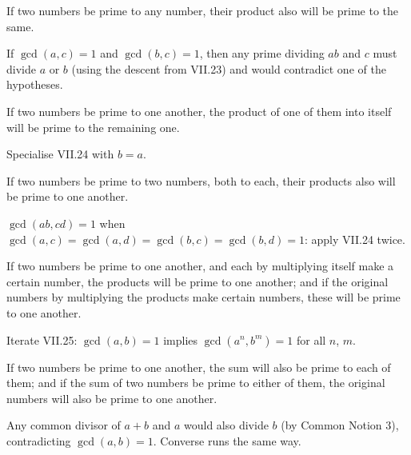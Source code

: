 \begin{claim}
\label{prop:VII.24}
If two numbers be prime to any number, their product also will be
prime to the same.
\end{claim}
\begin{evidence}
\label{ev:VII.24}
If $\gcd(a, c) = 1$ and $\gcd(b, c) = 1$, then any prime dividing
$ab$ and $c$ must divide $a$ or $b$ (using the descent from
VII.23) and would contradict one of the hypotheses.
\end{evidence}

\begin{claim}
\label{prop:VII.25}
If two numbers be prime to one another, the product of one of them
into itself will be prime to the remaining one.
\end{claim}
\begin{evidence}
\label{ev:VII.25}
Specialise VII.24 with $b = a$.
\end{evidence}

\begin{claim}
\label{prop:VII.26}
If two numbers be prime to two numbers, both to each, their products
also will be prime to one another.
\end{claim}
\begin{evidence}
\label{ev:VII.26}
$\gcd(ab, cd) = 1$ when $\gcd(a, c) = \gcd(a, d) = \gcd(b, c) =
\gcd(b, d) = 1$: apply VII.24 twice.
\end{evidence}

\begin{claim}
\label{prop:VII.27}
If two numbers be prime to one another, and each by multiplying
itself make a certain number, the products will be prime to one
another; and if the original numbers by multiplying the products
make certain numbers, these will be prime to one another.
\end{claim}
\begin{evidence}
\label{ev:VII.27}
Iterate VII.25: $\gcd(a, b) = 1$ implies $\gcd(a^n, b^m) = 1$ for
all $n$, $m$.
\end{evidence}

\begin{claim}
\label{prop:VII.28}
If two numbers be prime to one another, the sum will also be prime
to each of them; and if the sum of two numbers be prime to either of
them, the original numbers will also be prime to one another.
\end{claim}
\begin{evidence}
\label{ev:VII.28}
Any common divisor of $a + b$ and $a$ would also divide $b$ (by
Common Notion 3), contradicting $\gcd(a, b) = 1$.  Converse runs the
same way.
\end{evidence}

